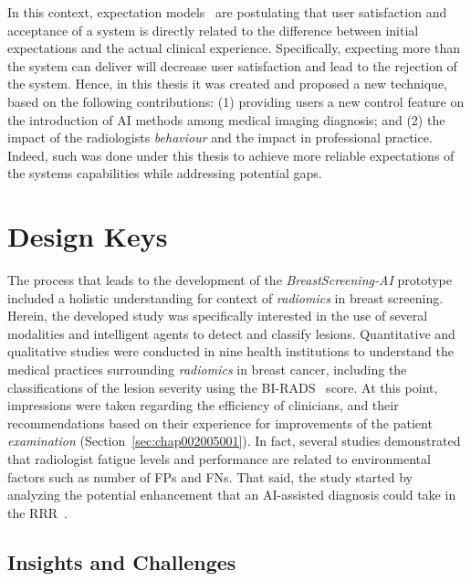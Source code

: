 In this context, expectation models~\cite{Kocielnik:2019:YAI:3290605.3300641, leung2019health} are postulating that user satisfaction and acceptance of a system is directly related to the difference between initial expectations and the actual clinical experience.
Specifically, expecting more than the system can deliver will decrease user satisfaction and lead to the rejection of the system.
Hence, in this thesis it was created and proposed a new technique, based on the following contributions:
(1) providing users a new control feature on the introduction of \ac{AI} methods among medical imaging diagnosis; and
(2) the impact of the radiologists {\it behaviour} and the impact in professional practice.
Indeed, such was done under this thesis to achieve more reliable expectations of the systems capabilities while addressing potential gaps.

\section{Design Keys}
\label{sec:chap005003}

The process that leads to the development of the {\it BreastScreening-AI} prototype~\cite{https://doi.org/10.13140/rg.2.2.29816.70409} included a holistic understanding for context of {\it radiomics} in breast screening.
Herein, the developed study was specifically interested in the use of several modalities and intelligent agents to detect and classify lesions.
Quantitative and qualitative studies were conducted in nine health institutions to understand the medical practices surrounding {\it radiomics} in breast cancer, including the classifications of the lesion severity using the \ac{BI-RADS}~\cite{https://doi.org/10.13140/rg.2.2.36306.86725} score.
At this point, impressions were taken regarding the efficiency of clinicians, and their recommendations based on their experience for improvements of the patient {\it examination} (Section~\ref{sec:chap002005001}).
In fact, several studies demonstrated~\cite{waite2017tired} that radiologist fatigue levels and performance are related to environmental factors such as number of \acp{FP} and \acp{FN}.
That said, the study started by analyzing the potential enhancement that an \ac{AI}-assisted diagnosis could take in the \ac{RRR}~\cite{chatelain2018evaluation, miglioretti2007radiologist}.

\subsection{Insights and Challenges}
\label{sec:chap005003001}


